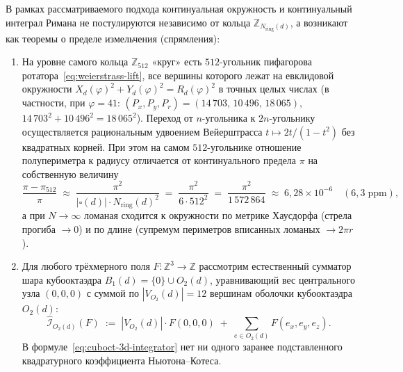 \documentclass[11pt,a4paper]{article}
\theoremstyle{plain}
\theoremstyle{definition}
\begin{document}
В рамках рассматриваемого подхода континуальная окружность и континуальный интеграл Римана не постулируются независимо от кольца $\mathbb{Z}_{N_{\mathrm{ring}}(d)}$, а возникают как теоремы о пределе измельчения (спрямления):
\begin{enumerate}[leftmargin=*,noitemsep]
\item На уровне самого кольца $\mathbb{Z}_{512}$ «круг» есть $512$-угольник пифагорова ротатора~\eqref{eq:weierstrass-lift}, все вершины которого лежат на евклидовой окружности $X_d(\varphi)^2+Y_d(\varphi)^2=R_d(\varphi)^2$ в точных целых числах (в частности, при $\varphi=41$: $(P_x,P_y,P_r)=(14\,703,\,10\,496,\,18\,065)$, $14\,703^2+10\,496^2=18\,065^2$). Переход от $n$-угольника к $2n$-угольнику осуществляется рациональным удвоением Вейерштрасса $t\mapsto 2t/(1-t^2)$ без квадратных корней. При этом на самом $512$-угольнике отношение полупериметра к радиусу отличается от континуального предела $\pi$ на собственную величину
  \begin{equation}
    \label{eq:pi-512-defect}
    \frac{\pi - \pi_{512}}{\pi} \;\approx\; \frac{\pi^2}{|\square(d)|\cdot N_{\mathrm{ring}}(d)^2} \;=\; \frac{\pi^2}{6\cdot 512^2} \;=\; \frac{\pi^2}{1\,572\,864} \;\approx\; 6{,}28\times 10^{-6}\quad (6{,}3\;\text{ppm}),
  \end{equation}
  а при $N\to\infty$ ломаная сходится к окружности по метрике Хаусдорфа (стрела прогиба $\to 0$) и по длине (супремум периметров вписанных ломаных $\to 2\pi r$).
\item Для любого трёхмерного поля $F\colon\mathbb{Z}^3\to\mathbb{Z}$ рассмотрим естественный сумматор шара кубооктаэдра $B_1(d)=\{0\}\cup O_2(d)$, уравнивающий вес центрального узла $(0,0,0)$ с суммой по $|V_{O_2}(d)|=12$ вершинам оболочки кубооктаэдра $O_2(d)$:
  \begin{equation}
    \label{eq:cuboct-3d-integrator}
    \widehat{\mathcal{I}}_{O_2(d)}(F) \;:=\; |V_{O_2}(d)|\cdot F(0,0,0) \;+\; \sum_{e\in O_2(d)} F(e_x,e_y,e_z).
  \end{equation}
  В формуле~\eqref{eq:cuboct-3d-integrator} нет ни одного заранее подставленного квадратурного коэффициента Ньютона--Котеса.
\end{enumerate}
\end{document}
